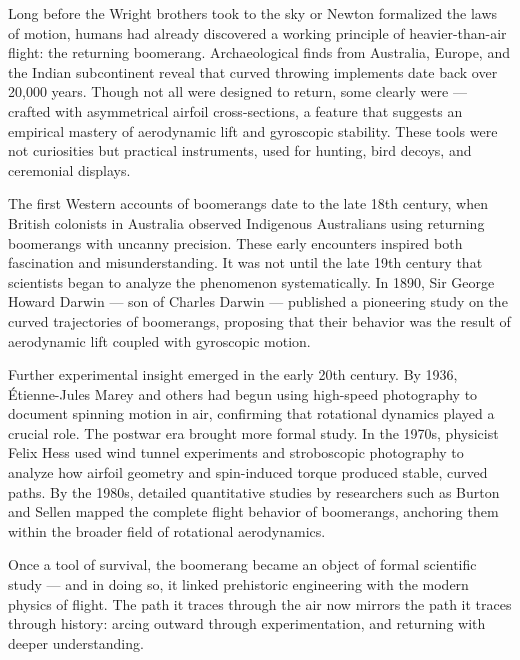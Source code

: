 \begin{historical}
Long before the Wright brothers took to the sky or Newton formalized the laws of motion, humans had already discovered a working principle of heavier-than-air flight: the returning boomerang. Archaeological finds from Australia, Europe, and the Indian subcontinent reveal that curved throwing implements date back over 20,000 years. Though not all were designed to return, some clearly were — crafted with asymmetrical airfoil cross-sections, a feature that suggests an empirical mastery of aerodynamic lift and gyroscopic stability. These tools were not curiosities but practical instruments, used for hunting, bird decoys, and ceremonial displays.

The first Western accounts of boomerangs date to the late 18th century, when British colonists in Australia observed Indigenous Australians using returning boomerangs with uncanny precision. These early encounters inspired both fascination and misunderstanding. It was not until the late 19th century that scientists began to analyze the phenomenon systematically. In 1890, Sir George Howard Darwin — son of Charles Darwin — published a pioneering study on the curved trajectories of boomerangs, proposing that their behavior was the result of aerodynamic lift coupled with gyroscopic motion.

Further experimental insight emerged in the early 20th century. By 1936, Étienne-Jules Marey and others had begun using high-speed photography to document spinning motion in air, confirming that rotational dynamics played a crucial role. The postwar era brought more formal study. In the 1970s, physicist Felix Hess used wind tunnel experiments and stroboscopic photography to analyze how airfoil geometry and spin-induced torque produced stable, curved paths. By the 1980s, detailed quantitative studies by researchers such as Burton and Sellen mapped the complete flight behavior of boomerangs, anchoring them within the broader field of rotational aerodynamics.

Once a tool of survival, the boomerang became an object of formal scientific study — and in doing so, it linked prehistoric engineering with the modern physics of flight. The path it traces through the air now mirrors the path it traces through history: arcing outward through experimentation, and returning with deeper understanding.
\end{historical}

